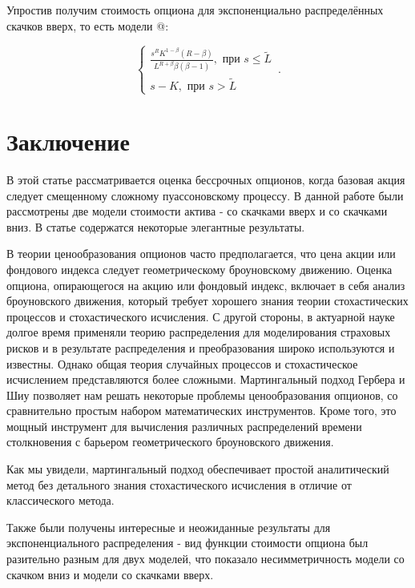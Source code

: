 \documentclass[a4paper,12pt]{article}
\makeatletter
\theoremstyle{definition}
\newcommand*{\rom}[1]{\expandafter\@slowromancap\romannumeral #1@}
\makeatother
\begin{document}
Упростив получим стоимость опциона для экспоненциально распределённых скачков вверх, то есть модели \rom{2}:

\begin{equation}\label{eq:option_price_m2_exp}
\begin{cases}
    \frac{s^R K^{1 - \beta} (R - \beta)}{L^{R + \beta} \beta (\beta - 1)}, \text{ при } s \le \widetilde{L}\\
    s - K, \text{ при } s > \widetilde{L}
\end{cases}\,.
\end{equation}

\section{Заключение}

В этой статье рассматривается оценка бессрочных опционов, когда базовая акция следует смещенному сложному пуассоновскому процессу. В данной работе были рассмотрены две модели стоимости актива - со скачками вверх и со скачками вниз. В статье содержатся некоторые элегантные результаты.

В теории ценообразования опционов часто предполагается, что цена акции или фондового индекса следует геометрическому броуновскому движению. Оценка опциона, опирающегося на акцию или фондовый индекс, включает в себя анализ броуновского движения, который требует хорошего знания теории стохастических процессов и стохастического исчисления. С другой стороны, в актуарной науке долгое время применяли теорию распределения для моделирования страховых рисков и в результате распределения и преобразования широко используются и известны. Однако общая теория случайных процессов и стохастическое исчислением представляются более сложными. Мартингальный подход Гербера и Шиу позволяет нам решать некоторые проблемы ценообразования опционов, со сравнительно простым набором математических инструментов. Кроме того, это мощный инструмент для вычисления различных распределений времени столкновения с барьером геометрического броуновского движения. 

Как мы увидели, мартингальный подход обеспечивает простой аналитический метод без детального знания стохастического исчисления в отличие от классического метода.

Также были получены интересные и неожиданные результаты для экспоненциального распределения - вид функции стоимости опциона был разительно разным для двух моделей, что показало несимметричность модели со скачком вниз и модели со скачками вверх.
\end{document}
